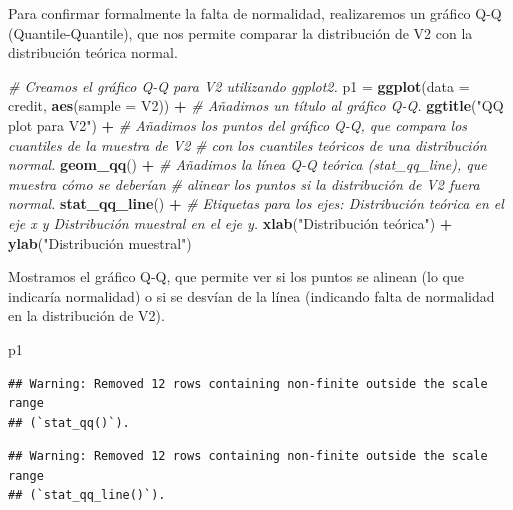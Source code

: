 \documentclass[
]{article}
\newenvironment{Shaded}{\begin{snugshade}}{\end{snugshade}}
\newcommand{\AttributeTok}[1]{\textcolor[rgb]{0.13,0.29,0.53}{#1}}
\newcommand{\CommentTok}[1]{\textcolor[rgb]{0.56,0.35,0.01}{\textit{#1}}}
\newcommand{\FunctionTok}[1]{\textcolor[rgb]{0.13,0.29,0.53}{\textbf{#1}}}
\newcommand{\NormalTok}[1]{#1}
\newcommand{\OtherTok}[1]{\textcolor[rgb]{0.56,0.35,0.01}{#1}}
\newcommand{\SpecialCharTok}[1]{\textcolor[rgb]{0.81,0.36,0.00}{\textbf{#1}}}
\newcommand{\StringTok}[1]{\textcolor[rgb]{0.31,0.60,0.02}{#1}}
\begin{document}
Para confirmar formalmente la falta de normalidad, realizaremos un
gráfico Q-Q (Quantile-Quantile), que nos permite comparar la
distribución de V2 con la distribución teórica normal.

\begin{Shaded}
\begin{Highlighting}[]
\CommentTok{\# Creamos el gráfico Q{-}Q para V2 utilizando ggplot2.}
\NormalTok{p1 }\OtherTok{=} \FunctionTok{ggplot}\NormalTok{(}\AttributeTok{data =}\NormalTok{ credit, }\FunctionTok{aes}\NormalTok{(}\AttributeTok{sample =}\NormalTok{ V2)) }\SpecialCharTok{+}
  \CommentTok{\# Añadimos un título al gráfico Q{-}Q.}
  \FunctionTok{ggtitle}\NormalTok{(}\StringTok{"QQ plot para V2"}\NormalTok{) }\SpecialCharTok{+}
  \CommentTok{\# Añadimos los puntos del gráfico Q{-}Q, que compara los cuantiles de la muestra de V2 }
  \CommentTok{\# con los cuantiles teóricos de una distribución normal.}
  \FunctionTok{geom\_qq}\NormalTok{() }\SpecialCharTok{+} 
  \CommentTok{\# Añadimos la línea Q{-}Q teórica (stat\_qq\_line), que muestra cómo se deberían }
  \CommentTok{\# alinear los puntos si la distribución de V2 fuera normal.}
  \FunctionTok{stat\_qq\_line}\NormalTok{() }\SpecialCharTok{+} 
  \CommentTok{\# Etiquetas para los ejes: \textquotesingle{}Distribución teórica\textquotesingle{} en el eje x y \textquotesingle{}Distribución muestral\textquotesingle{} en el eje y.}
  \FunctionTok{xlab}\NormalTok{(}\StringTok{"Distribución teórica"}\NormalTok{) }\SpecialCharTok{+} 
  \FunctionTok{ylab}\NormalTok{(}\StringTok{"Distribución muestral"}\NormalTok{)}
\end{Highlighting}
\end{Shaded}

Mostramos el gráfico Q-Q, que permite ver si los puntos se alinean (lo
que indicaría normalidad) o si se desvían de la línea (indicando falta
de normalidad en la distribución de V2).

\begin{Shaded}
\begin{Highlighting}[]
\NormalTok{p1}
\end{Highlighting}
\end{Shaded}

\begin{verbatim}
## Warning: Removed 12 rows containing non-finite outside the scale range
## (`stat_qq()`).
\end{verbatim}

\begin{verbatim}
## Warning: Removed 12 rows containing non-finite outside the scale range
## (`stat_qq_line()`).
\end{verbatim}
\end{document}
